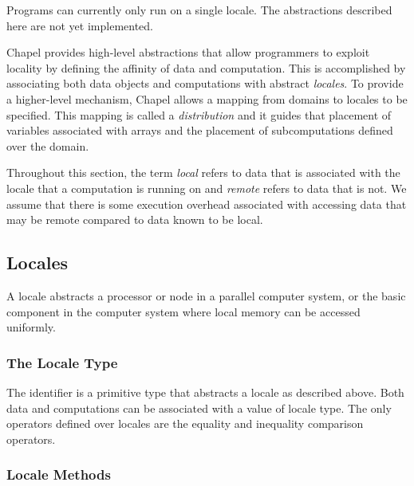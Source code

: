 \label{Locality_and_Distribution}

\begin{status}
Programs can currently only run on a single locale.  The abstractions
described here are not yet implemented.
\end{status}

Chapel provides high-level abstractions that allow programmers to
exploit locality by defining the affinity of data and computation.
This is accomplished by associating both data objects and computations
with abstract {\em locales}. To provide a higher-level mechanism,
Chapel allows a mapping from domains to locales to be specified. This
mapping is called a {\em distribution} and it guides that placement of
variables associated with arrays and the placement of subcomputations
defined over the domain.

Throughout this section, the term {\em local} refers to data that is
associated with the locale that a computation is running on and {\em
remote} refers to data that is not. We assume that there is some
execution overhead associated with accessing data that may be remote
compared to data known to be local.

\subsection{Locales}
\label{Locales}

A locale abstracts a processor or node in a parallel computer system,
or the basic component in the computer system where local memory can
be accessed uniformly.

\subsubsection{The Locale Type}
\label{The_Locale_Type}

The identifier  is a primitive type that abstracts a
locale as described above.  Both data and computations can be
associated with a value of locale type. The only operators defined
over locales are the equality and inequality comparison operators.

\subsubsection{Locale Methods}
\label{Locale_Methods}

